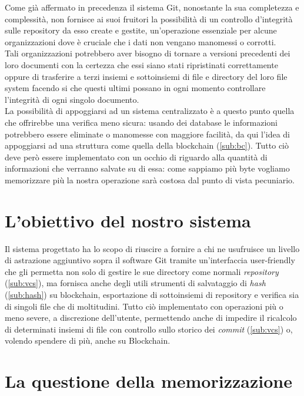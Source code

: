 
Come già affermato in precedenza il sistema Git,
nonostante la sua completezza e complessità,
non fornisce ai suoi fruitori la possibilità di un controllo d’integrità
sulle repository da esso create e gestite, un’operazione essenziale per
alcune organizzazioni dove è cruciale che i dati non vengano manomessi o corrotti. \\
Tali organizzazioni potrebbero aver bisogno di tornare a versioni precedenti
dei loro documenti con la certezza che essi siano stati ripristinati
correttamente oppure di trasferire a terzi insiemi e sottoinsiemi
di file e directory del loro file system facendo si che questi ultimi
possano in ogni momento controllare l’integrità di ogni singolo documento. \\
La possibilità di appoggiarsi ad un sistema centralizzato è a questo punto quella
che offrirebbe una verifica meno sicura: usando dei database le informazioni
potrebbero essere eliminate o manomesse con maggiore facilità,
da qui l’idea di appoggiarsi ad una struttura come quella della blockchain (\autoref{sub:bc}).
Tutto ciò deve però essere implementato con un occhio di riguardo alla quantità
di informazioni che verranno salvate su di essa: come sappiamo più byte vogliamo
memorizzare più la nostra operazione sarà costosa dal punto di vista pecuniario.

\section{L’obiettivo del nostro sistema}

Il sistema progettato ha lo scopo di riuscire a fornire a chi ne usufruisce
un livello di astrazione aggiuntivo sopra il software Git tramite un’interfaccia
user-friendly che gli permetta non solo di gestire le sue directory come normali
\emph{repository} (\autoref{sub:vcs}), ma fornisca anche degli utili strumenti di
salvataggio di \emph{hash} (\autoref{sub:hash}) su blockchain, esportazione di sottoinsiemi di repository
e verifica sia di singoli file che di moltitudini.
Tutto ciò implementato con operazioni più o meno severe, a discrezione dell’utente,
permettendo anche di impedire il ricalcolo di determinati insiemi di file con controllo
sullo storico dei \emph{commit} (\autoref{sub:vcs}) o, volendo spendere di più, anche su Blockchain.

\section{La questione della memorizzazione}

